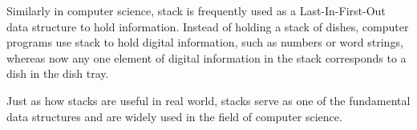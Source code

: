 \documentclass[11pt]{article}
\begin{document}
Similarly in computer science, stack is frequently used as a Last-In-First-Out data structure to hold information. Instead of holding a stack of dishes, computer programs use stack to hold digital information, such as numbers or word strings, whereas now any one element of digital information in the stack corresponds to a dish in the dish tray.

Just as how stacks are useful in real world, stacks serve as one of the fundamental data structures and are widely used in the field of computer science.
\end{document}

